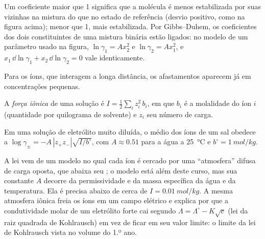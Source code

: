 Um coeficiente maior que 1 significa que a molécula é menos estabilizada
por suas vizinhas na mistura do que no estado de referência (desvio
positivo, como na figura acima); menor que 1, mais estabilizada. Por
Gibbs--Duhem, os coeficientes dos dois constituintes de uma mistura binária
estão ligados: no modelo de um parâmetro usado na figura, $\ln\gamma_1 = Ax_2^2$
e $\ln\gamma_2 = Ax_1^2$, e
$x_1\,\dd\ln\gamma_1 + x_2\,\dd\ln\gamma_2 = 0$ vale identicamente.

Para os íons, que interagem a longa distância, os afastamentos aparecem já
em concentrações pequenas.

\begin{definition}\label{def:b2:chemical-potential:ionic-strength}
A \emph{força iônica} de uma solução é $I =
\frac12\sum_i z_i^2\,b_i$, em que $b_i$ é a molalidade do íon $i$ (quantidade
por quilograma de solvente) e $z_i$ seu número de carga.
\end{definition}

\begin{proposition}\label{prop:b2:chemical-potential:debye-huckel}
Em uma solução de eletrólito muito diluída, o  médio
dos íons de um sal obedece a $\log\gamma_\pm = -A\,|z_+z_-|\sqrt{I/b^\circ}$, com $A
\approx 0.51$ para a água a \qty{25}{\celsius} e $b^\circ =
\qty{1}{mol/kg}$.
\end{proposition}
\admitted

\begin{remark}\label{rem:b2:chemical-potential:dh-range}
A lei vem de um modelo no qual cada íon é cercado por uma ``atmosfera''
difusa de carga oposta, que abaixa seu ; o modelo está
além deste curso, mas sua constante $A$ decorre da permissividade e da
massa específica da água e da temperatura. Ela é precisa abaixo de cerca de
$I = \qty{0.01}{mol/kg}$. A mesma atmosfera iônica freia os íons em um
campo elétrico e explica por que a condutividade molar de um eletrólito
forte cai segundo $\Lambda = \Lambda^\circ - K\sqrt c$ (lei da raiz
quadrada de Kohlrausch) em vez de ficar em seu valor limite: o limite da
lei de Kohlrausch vista no volume do 1.º ano.
\end{remark}


